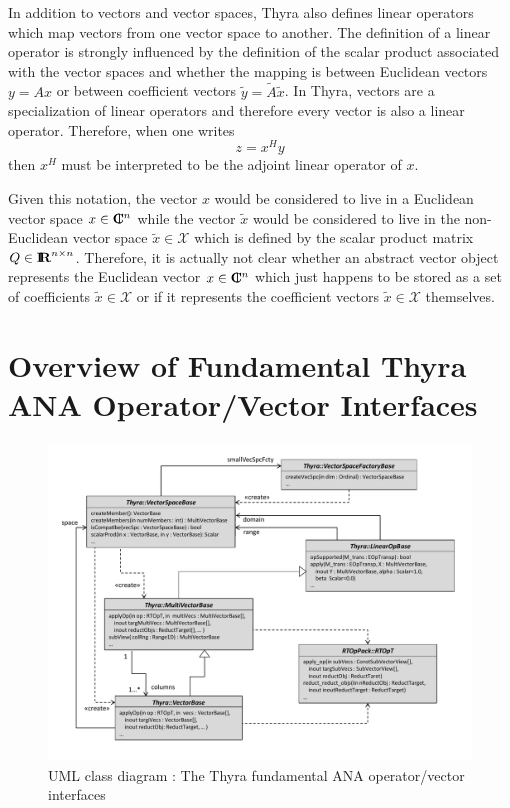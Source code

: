 \documentclass[pdf,ps2pdf,11pt]{SANDreport}
\begin{document}
In addition to vectors and vector spaces, Thyra also defines linear
operators which map vectors from one vector space to another.  The
definition of a linear operator is strongly influenced by the
definition of the scalar product associated with the vector spaces and
whether the mapping is between Euclidean vectors $y = A x$ or between
coefficient vectors $\tilde{y} = {}\tilde{A} {}\tilde{x}$.
In Thyra, vectors are a specialization of linear operators and therefore every
vector is also a linear operator.  Therefore, when one writes
%
\begin{equation}
z = x^H y
\end{equation}
%
then $x^H$ must be interpreted to be the adjoint linear operator of $x$.

Given this notation, the vector $x$ would be considered to live in a
Euclidean vector space $x\in\mbox{\textbf{C}}\hspace{-1.1ex}\mbox{l}\hspace{0.4ex}^n$ while the vector $\tilde{x}$
would be considered to live in the non-Euclidean vector space
$\tilde{x}\in\mathcal{X}$ which is defined by the scalar product
matrix $Q\in\mbox{\textbf{I}}\hspace{-0.6ex}\mbox{\textbf{R}}^{n\times{}n}$.  Therefore, it is actually not clear
whether an abstract vector object represents the Euclidean vector
$x\in\mbox{\textbf{C}}\hspace{-1.1ex}\mbox{l}\hspace{0.4ex}^n$ which just happens to be stored as a set of coefficients
$\tilde{x}\in\mathcal{X}$ or if it represents the coefficient vectors
$\tilde{x}\in\mathcal{X}$ themselves.


%
\section{Overview of Fundamental Thyra ANA Operator/Vector Interfaces}
\label{thyra:sec:Thyra_core_overview}
%

{\bsinglespace
\begin{figure}[p]
\begin{center}
\includegraphics*[scale=0.65]{ThyraANAOpVecInterfaces}
\end{center}
\caption{
\label{thyra:fig:basic_op_vec_itfc}
UML class diagram : The Thyra fundamental ANA operator/vector interfaces }
\end{figure}
\esinglespace}
\end{document}
